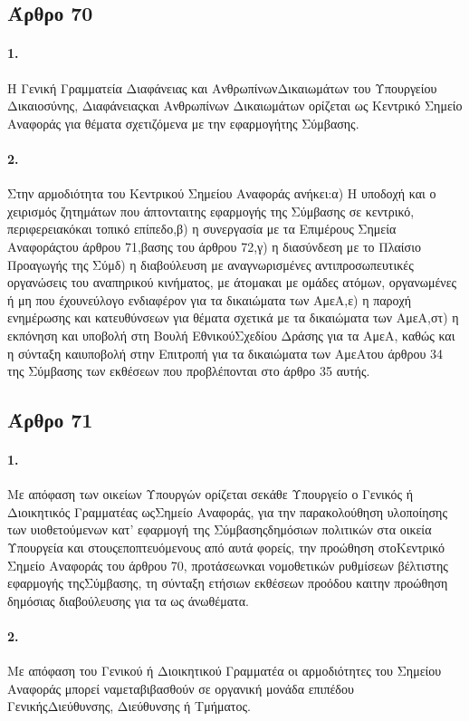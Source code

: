 \documentclass[a4paper,oneside, 10pt]{book}
\begin{document}
\subsection*{ Άρθρο 70 }
\paragraph { 1. } Η Γενική Γραμματεία Διαφάνειας και ΑνθρωπίνωνΔικαιωμάτων του Υπουργείου Δικαιοσύνης, Διαφάνειαςκαι Ανθρωπίνων Δικαιωμάτων ορίζεται ως Κεντρικό Σημείο Αναφοράς για θέματα σχετιζόμενα με την εφαρμογήτης Σύμβασης.
\paragraph { 2. } Στην αρμοδιότητα του Κεντρικού Σημείου Αναφοράς ανήκει:α) Η υποδοχή και ο χειρισμός ζητημάτων που άπτονταιτης εφαρμογής της Σύμβασης σε κεντρικό, περιφερειακόκαι τοπικό επίπεδο,β) η συνεργασία με τα Επιμέρους Σημεία Αναφοράςτου άρθρου 71,βασης του άρθρου 72,γ) η διασύνδεση με το Πλαίσιο Προαγωγής της Σύμδ) η διαβούλευση με αναγνωρισμένες αντιπροσωπευτικές οργανώσεις του αναπηρικού κινήματος, με άτομακαι με ομάδες ατόμων, οργανωμένες ή μη που έχουνεύλογο ενδιαφέρον για τα δικαιώματα των ΑμεΑ,ε) η παροχή ενημέρωσης και κατευθύνσεων για θέματα σχετικά με τα δικαιώματα των ΑμεΑ,στ) η εκπόνηση και υποβολή στη Βουλή ΕθνικούΣχεδίου Δράσης για τα ΑμεΑ, καθώς και η σύνταξη καιυποβολή στην Επιτροπή για τα δικαιώματα των ΑμεΑτου άρθρου 34 της Σύμβασης των εκθέσεων που προβλέπονται στο άρθρο 35 αυτής.
\subsection*{ Άρθρο 71 }
\paragraph { 1. } Με απόφαση των οικείων Υπουργών ορίζεται σεκάθε Υπουργείο ο Γενικός ή Διοικητικός Γραμματέας ωςΣημείο Αναφοράς, για την παρακολούθηση υλοποίησης των υιοθετούμενων κατ’ εφαρμογή της Σύμβασηςδημόσιων πολιτικών στα οικεία Υπουργεία και στουςεποπτευόμενους από αυτά φορείς, την προώθηση στοΚεντρικό Σημείο Αναφοράς του άρθρου 70, προτάσεωνκαι νομοθετικών ρυθμίσεων βέλτιστης εφαρμογής τηςΣύμβασης, τη σύνταξη ετήσιων εκθέσεων προόδου καιτην προώθηση δημόσιας διαβούλευσης για τα ως άνωθέματα.
\paragraph { 2. } Με απόφαση του Γενικού ή Διοικητικού Γραμματέα οι αρμοδιότητες του Σημείου Αναφοράς μπορεί ναμεταβιβασθούν σε οργανική μονάδα επιπέδου ΓενικήςΔιεύθυνσης, Διεύθυνσης ή Τμήματος.
\end{document}
